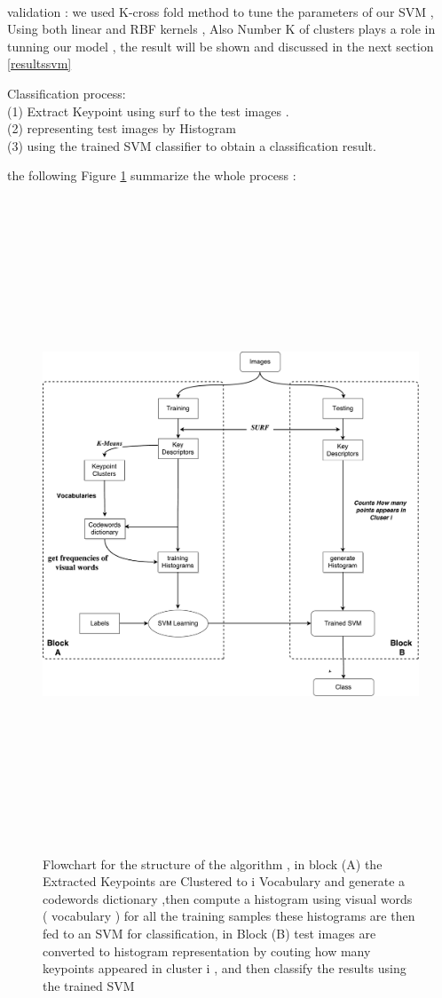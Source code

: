 \\validation :
we used K-cross fold method to tune the parameters of our SVM  , Using both linear and RBF kernels , Also Number K of clusters plays a role in tunning our model , the result will be shown and discussed in the next section \ref{resultssvm} 

 Classiﬁcation
process:\\ (1) Extract Keypoint using surf to the test images . \\(2) representing test images by Histogram \\ (3)
using the trained SVM classiﬁer to obtain a classiﬁcation
result.

the following Figure \ref{fig:algo1}  summarize the whole  process :

\begin{figure}[H]
\centering
\includegraphics[width=17cm, height=19.5cm ]{img/myalgo.pdf}
\caption{Flowchart for the structure of the algorithm , in block (A) the Extracted Keypoints  are Clustered to i Vocabulary and generate a codewords dictionary  ,then compute a histogram using visual words ( vocabulary ) for all the training samples these histograms are then fed to an SVM for classification, in Block (B) test images are converted to histogram representation by couting how many keypoints appeared in cluster i ,  and then classify the results using the trained SVM }
\label{fig:algo1}
\end{figure}



